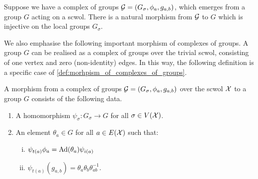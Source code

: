 \begin{remark}
	\label{rem:morphism_from_developed_cx_of_groups}
	Suppose we have a complex of groups $\mathcal{G} = (G_\sigma, \phi_a, g_{a,b})$, which emerges from a group  $G$ acting on a scwol.
	There is a natural morphism from $\mathcal{G}$ to $G$ which is injective on the local groups  $G_\sigma$.
\end{remark}
We also emphasise the following important morphism of complexes of groups.
A group $G$ can be realised as a complex of groups over the trivial scwol, consisting of one vertex and zero (non-identity) edges.
In this way, the following definition is a specific case of \cref{def:morhpism_of_complexes_of_groups}.

\begin{definition}
	A morphism from a complex of groups $\mathcal{G} = (G_\sigma, \phi_a, g_{a,b})$ over the scwol $\mathcal{X}$ to a group $G$ consists of the following data.
	\begin{enumerate}
		\item A homomorphism $\psi_\sigma \colon G_\sigma \to G$ for all $\sigma \in V(\mathcal{X})$.
		\item An element $\theta_a \in G$ for all $a \in E(\mathcal{X})$ such that:
		      \begin{enumerate}[(i)]
			      \item $\psi_{t(a)}\phi_a = \operatorname{Ad}(\theta_a)\psi_{i(a)}$
			      \item $\psi_{t(a)}(g_{a,b}) = \theta_a\theta_b\theta_{ab}^{-1}$.
		      \end{enumerate}
	\end{enumerate}
	\label{def:morphism_of_complex_of_groups_to_group}
\end{definition}

